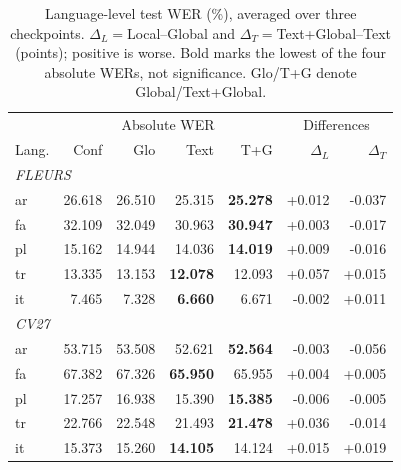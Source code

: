 \begin{table}[t]\centering\setlength{\tabcolsep}{2pt}
\caption{Language-level test WER (\%), averaged over three checkpoints. $\Delta_L=$Local--Global and $\Delta_T=$Text+Global--Text (points); positive is worse. Bold marks the lowest of the four absolute WERs, not significance. Glo/T+G denote Global/Text+Global.}\label{tab:languages}
\begin{tabular}{lrrrrrr}\toprule
 & \multicolumn{4}{c}{Absolute WER} & \multicolumn{2}{c}{Differences} \\
Lang. & Conf & Glo & Text & T+G & $\Delta_L$ & $\Delta_T$ \\\midrule
\multicolumn{7}{l}{\textit{FLEURS}}\\
ar & 26.618 & 26.510 & 25.315 & \textbf{25.278} & +0.012 & -0.037 \\
fa & 32.109 & 32.049 & 30.963 & \textbf{30.947} & +0.003 & -0.017 \\
pl & 15.162 & 14.944 & 14.036 & \textbf{14.019} & +0.009 & -0.016 \\
tr & 13.335 & 13.153 & \textbf{12.078} & 12.093 & +0.057 & +0.015 \\
it & 7.465 & 7.328 & \textbf{6.660} & 6.671 & -0.002 & +0.011 \\
\midrule
\multicolumn{7}{l}{\textit{CV27}}\\
ar & 53.715 & 53.508 & 52.621 & \textbf{52.564} & -0.003 & -0.056 \\
fa & 67.382 & 67.326 & \textbf{65.950} & 65.955 & +0.004 & +0.005 \\
pl & 17.257 & 16.938 & 15.390 & \textbf{15.385} & -0.006 & -0.005 \\
tr & 22.766 & 22.548 & 21.493 & \textbf{21.478} & +0.036 & -0.014 \\
it & 15.373 & 15.260 & \textbf{14.105} & 14.124 & +0.015 & +0.019 \\
\bottomrule\end{tabular}\end{table}
